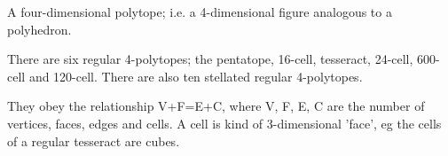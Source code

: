 A four-dimensional polytope; i.e. a 4-dimensional figure analogous
to a polyhedron.
\par
There are six regular 4-polytopes; the pentatope, 16-cell,
tesseract, 24-cell, 600-cell and 120-cell. There are also ten
stellated regular 4-polytopes.
\par
They obey the relationship V+F=E+C, where V, F, E, C are the
number of vertices, faces, edges and cells. A cell is kind
of 3-dimensional 'face', eg the cells of a regular tesseract are cubes.
